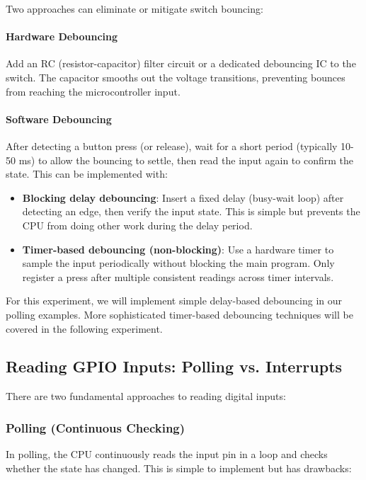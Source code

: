 Two approaches can eliminate or mitigate switch bouncing:

\paragraph{Hardware Debouncing}
Add an RC (resistor-capacitor) filter circuit or a dedicated debouncing IC to the switch. The capacitor smooths out the voltage transitions, preventing bounces from reaching the microcontroller input.

\paragraph{Software Debouncing}
After detecting a button press (or release), wait for a short period (typically 10-50 ms) to allow the bouncing to settle, then read the input again to confirm the state. This can be implemented with:
\begin{itemize}[nosep]
  \item \textbf{Blocking delay debouncing}: Insert a fixed delay (busy-wait loop) after detecting an edge, then verify the input state. This is simple but prevents the CPU from doing other work during the delay period.
  \item \textbf{Timer-based debouncing (non-blocking)}: Use a hardware timer to sample the input periodically without blocking the main program. Only register a press after multiple consistent readings across timer intervals.
\end{itemize}

\noindent
For this experiment, we will implement simple delay-based debouncing in our polling examples. More sophisticated timer-based debouncing techniques will be covered in the following experiment.

\subsection{Reading GPIO Inputs: Polling vs. Interrupts}

There are two fundamental approaches to reading digital inputs:

\subsubsection{Polling (Continuous Checking)}

In polling, the CPU continuously reads the input pin in a loop and checks whether the state has changed. This is simple to implement but has drawbacks:

